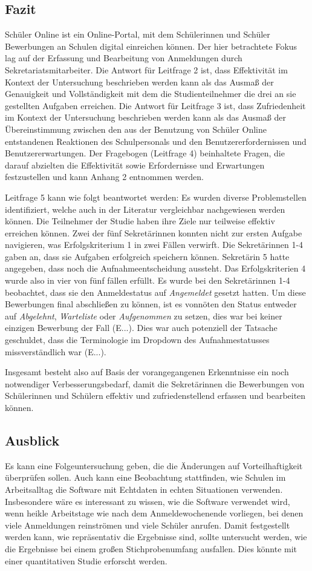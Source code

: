 \subsection{Fazit}
Schüler Online ist ein Online-Portal, mit dem Schülerinnen und Schüler Bewerbungen an Schulen digital einreichen können. Der hier betrachtete Fokus lag auf der Erfassung und Bearbeitung von Anmeldungen durch Sekretariatsmitarbeiter.
Die Antwort für Leitfrage 2 ist, dass Effektivität im Kontext der Untersuchung beschrieben werden kann als das Ausmaß der Genauigkeit und Vollständigkeit mit dem die Studienteilnehmer die drei an sie gestellten Aufgaben erreichen.  
Die Antwort für Leitfrage 3 ist, dass Zufriedenheit im Kontext der Untersuchung beschrieben werden kann als das Ausmaß der Übereinstimmung zwischen den aus der Benutzung von Schüler Online entstandenen Reaktionen des Schulpersonals und den Benutzererfordernissen und Benutzererwartungen. 
Der Fragebogen (Leitfrage 4) beinhaltete Fragen, die darauf abzielten die Effektivität sowie Erfordernisse und Erwartungen festzustellen und kann Anhang 2 entnommen werden.

Leitfrage 5 kann wie folgt beantwortet werden: Es wurden diverse Problemstellen identifiziert, welche auch in der Literatur vergleichbar nachgewiesen werden können.
Die Teilnehmer der Studie haben ihre Ziele nur teilweise effektiv erreichen können. Zwei der fünf Sekretärinnen konnten nicht zur ersten Aufgabe navigieren, was Erfolgskriterium 1 in zwei Fällen verwirft. Die Sekretärinnen 1-4 gaben an, dass sie Aufgaben erfolgreich speichern können. Sekretärin 5 hatte angegeben, dass noch die Aufnahmeentscheidung aussteht. Das Erfolgskriterien 4 wurde also in vier von fünf fällen erfüllt.
Es wurde bei den Sekretärinnen 1-4 beobachtet, dass sie den Anmeldestatus auf \textit{Angemeldet} gesetzt hatten. Um diese Bewerbungen final abschließen zu können, ist es vonnöten den Status entweder auf \textit{Abgelehnt}, \textit{Warteliste} oder \textit{Aufgenommen} zu setzen, dies war bei keiner einzigen Bewerbung der Fall (E...). Dies war auch potenziell der Tatsache geschuldet, dass die Terminologie im Dropdown des Aufnahmestatusses missverständlich war (E...).

Insgesamt besteht also auf Basis der vorangegangenen Erkenntnisse ein noch notwendiger Verbesserungsbedarf, damit die Sekretärinnen die Bewerbungen von Schülerinnen und Schülern effektiv und zufriedenstellend erfassen und bearbeiten können.

\subsection{Ausblick}
Es kann eine Folgeuntersuchung geben, die die Änderungen auf Vorteilhaftigkeit überprüfen sollen.
Auch kann eine Beobachtung stattfinden, wie Schulen im Arbeitsalltag die Software mit Echtdaten in echten Situationen verwenden. Insbesondere wäre es interessant zu wissen, wie die Software verwendet wird, wenn heikle Arbeitstage wie nach dem Anmeldewochenende vorliegen, bei denen viele Anmeldungen reinströmen und viele Schüler anrufen.
Damit festgestellt werden kann, wie repräsentativ die Ergebnisse sind, sollte untersucht werden, wie die Ergebnisse bei einem großen Stichprobenumfang ausfallen. Dies könnte mit einer quantitativen Studie erforscht werden.
